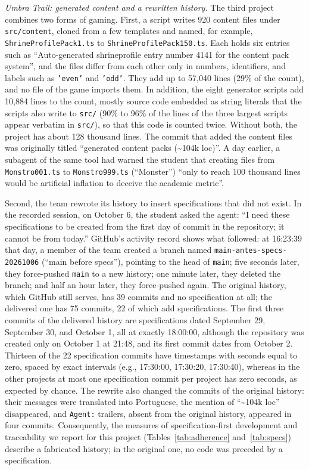 \documentclass[conference]{IEEEtran}
\begin{document}
\emph{Umbra Trail: generated content and a rewritten history.} The third project combines two forms of gaming. First, a script writes 920 content files under \texttt{src/content}, cloned from a few templates and named, for example, \texttt{ShrineProfilePack1.ts} to \texttt{ShrineProfilePack150.ts}. Each holds six entries such as ``Auto-generated shrineprofile entry number 4141 for the content pack system'', and the files differ from each other only in numbers, identifiers, and labels such as \texttt{'even'} and \texttt{'odd'}. They add up to 57,040 lines (29\% of the count), and no file of the game imports them. In addition, the eight generator scripts add 10,884 lines to the count, mostly source code embedded as string literals that the scripts also write to \texttt{src/} (90\% to 96\% of the lines of the three largest scripts appear verbatim in \texttt{src/}), so that this code is counted twice. Without both, the project has about 128 thousand lines. The commit that added the content files was originally titled ``generated content packs (\textasciitilde104k loc)''. A day earlier, a subagent of the same tool had warned the student that creating files from \texttt{Monstro001.ts} to \texttt{Monstro999.ts} (``Monster'') ``only to reach 100 thousand lines would be artificial inflation to deceive the academic metric''.

Second, the team rewrote its history to insert specifications that did not exist. In the recorded session, on October 6, the student asked the agent: ``I need these specifications to be created from the first day of commit in the repository; it cannot be from today.'' GitHub's activity record shows what followed: at 16:23:39 that day, a member of the team created a branch named \texttt{main-antes-specs-20261006} (``main before specs''), pointing to the head of \texttt{main}; five seconds later, they force-pushed \texttt{main} to a new history; one minute later, they deleted the branch; and half an hour later, they force-pushed again. The original history, which GitHub still serves, has 39 commits and no specification at all; the delivered one has 75 commits, 22 of which add specifications. The first three commits of the delivered history are specifications dated September 29, September 30, and October 1, all at exactly 18:00:00, although the repository was created only on October 1 at 21:48, and its first commit dates from October 2. Thirteen of the 22 specification commits have timestamps with seconds equal to zero, spaced by exact intervals (e.g., 17:30:00, 17:30:20, 17:30:40), whereas in the other projects at most one specification commit per project has zero seconds, as expected by chance. The rewrite also changed the commits of the original history: their messages were translated into Portuguese, the mention of ``\textasciitilde104k loc'' disappeared, and \texttt{Agent:} trailers, absent from the original history, appeared in four commits. Consequently, the measures of specification-first development and traceability we report for this project (Tables~\ref{tab:adherence} and~\ref{tab:specs}) describe a fabricated history; in the original one, no code was preceded by a specification.
\end{document}
